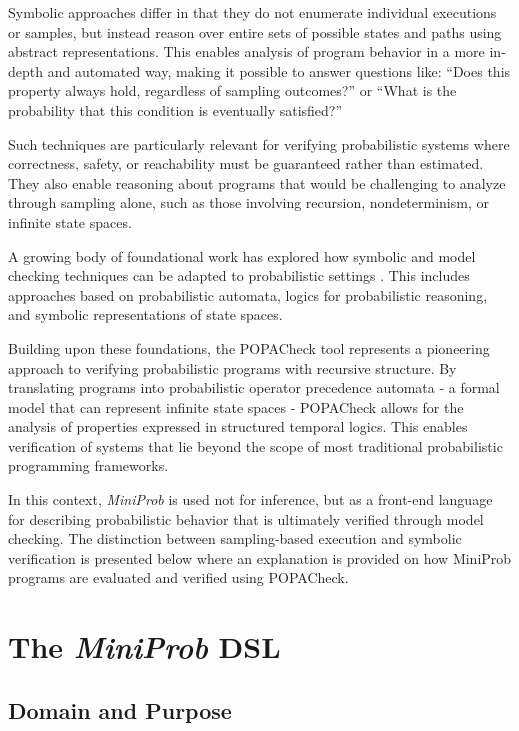 \documentclass[11pt]{report}
\begin{document}
Symbolic approaches differ in that they do not enumerate individual executions or samples, but instead reason over entire sets of possible states and paths using
abstract representations. This enables analysis of program behavior in a more in-depth and automated way, making it possible to answer questions like:
“Does this property always hold, regardless of sampling outcomes?” or “What is the probability that this condition is eventually satisfied?”

Such techniques are particularly relevant for verifying probabilistic systems where correctness, safety, or reachability must be guaranteed rather than estimated.
They also enable reasoning about programs that would be challenging to analyze through sampling alone, such as those involving recursion, nondeterminism, or infinite state
spaces.

A growing body of foundational work has explored how symbolic and model checking techniques can be adapted to probabilistic 
settings \cite{BaierClarkeHartonasGarmhausenKwiatkowskaRyan1997,EsparzaKuceraMayr2006,EtessamiYannakakis2012}. This includes approaches based on probabilistic automata, logics for probabilistic reasoning, and
symbolic representations of state spaces.

Building upon these foundations, the POPACheck tool \cite{POPACheck} represents a pioneering approach to verifying probabilistic programs with recursive structure.
By translating programs into probabilistic operator precedence automata - a formal model that can represent infinite state spaces - POPACheck allows for the analysis
of properties expressed in structured temporal logics. This enables verification of systems that lie beyond the scope of most traditional probabilistic programming
frameworks.

In this context, \emph{MiniProb} is used not for inference, but as a front-end language for describing probabilistic behavior that is ultimately verified through
model checking. The distinction between sampling-based execution and symbolic verification is presented below where an explanation is provided on how MiniProb 
programs are evaluated and verified using POPACheck.


\label{sec:miniprob}
\chapter{The \textit{MiniProb} DSL}
\section{Domain and Purpose}
\end{document}
